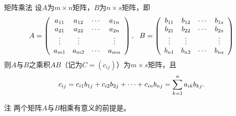 \begin{frame}
  \begin{footnotesize}
    \begin{block}{矩阵乘法}
      设$A$为$m\times n$矩阵，$B$为$n\times s$矩阵，即
      $$
      A = \left(
        \begin{array}{cccc}
          a_{11} & a_{12} & \cdots & a_{1n}\\
          a_{21} & a_{22} & \cdots & a_{2n}\\
          \vdots   & \vdots   &     & \vdots \\
          a_{m1} & a_{m2} & \cdots & a_{mn}
        \end{array}
      \right), ~~
      B = \left(
        \begin{array}{cccc}
          b_{11} & b_{12} & \cdots & b_{1s}\\
          b_{21} & b_{22} & \cdots & b_{2s}\\
          \vdots   & \vdots   &     & \vdots \\
          b_{n1} & b_{n2} & \cdots & b_{ns}
        \end{array}
      \right)
      $$
      则$A$与$B$之乘积$AB$（记为$C=(c_{ij})$）为$m\times s$矩阵，且
      $$
      c_{ij} = c_{i1}b_{1j} + c_{i2}b_{2j} + \cdots + c_{in}b_{nj} = \sum_{k=1}^na_{ik}b_{kj}.
      $$
    \end{block}
    \pause 
    \begin{block}{注}
      两个矩阵$A$与$B$相乘有意义的前提是。
    \end{block}
  \end{footnotesize}
\end{frame}



